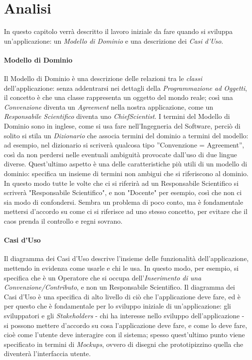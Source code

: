 \section{Analisi}
In questo capitolo verrà descritto il lavoro iniziale da fare quando si sviluppa un'applicazione: un \textsl{Modello di Dominio} e una descrizione dei \textsl{Casi d'Uso}.
\paragraph{Modello di Dominio}
Il Modello di Dominio è una descrizione delle relazioni tra le \textsl{classi} dell'applicazione: senza addentrarsi nei dettagli della \textsl{Programmazione ad Oggetti}, il concetto è che una classe rappresenta un oggetto del mondo reale; così una \textsl{Convenzione} diventa un \textsl{Agreement} nella nostra applicazione, come un \textsl{Responsabile Scientifico} diventa uno \textsl{ChiefScientist}.\newline 
I termini del Modello di Dominio sono in inglese, come si usa fare nell'Ingegneria del Software, perciò di solito si stila un \textsl{Dizionario} che associa termini del dominio a termini del modello: ad esempio, nel dizionario si scriverà qualcosa tipo ''Convenzione = Agreement'', così da non perdersi nelle eventuali ambiguità provocate dall'uso di due lingue diverse.\newline
Quest'ultimo aspetto è una delle caratteristiche più utili di un modello di dominio: specifica un insieme di termini non ambigui che si riferiscono al dominio. In questo modo tutte le volte che ci si riferirà ad un Responsabile Scientifico si scriverà "Responsabile Scientifico", e non "Docente" per esempio, così che non ci sia modo di confondersi. Sembra un problema di poco conto, ma è fondamentale mettersi d'accordo su come ci si riferisce ad uno stesso concetto, per evitare che il caos prenda il controllo e regni sovrano.
\paragraph{Casi d'Uso}
Il diagramma dei Casi d'Uso descrive l'insieme delle funzionalità dell'applicazione, mettendo in evidenza come usarle e chi le usa. In questo modo, per esempio, si specifica che è un Operatore che si occupa dell'\textsl{Inserimento di una Convenzione/Contributo}, e non un Responsabile Scientifico.\newline
Il diagramma dei Casi d'Uso è una specifica di alto livello di ciò che l'applicazione deve fare, ed è per questo che è fondamentale per lo sviluppo iniziale di un'applicazione: gli sviluppatori e gli \textsl{Stakeholders} - chi ha interesse nello sviluppo dell'applicazione - si possono mettere d'accordo su cosa l'applicazione deve fare, e come lo deve fare, cioè come l'utente deve interagire con il sistema; spesso quest'ultimo punto viene specificato in termini di \textsl{Mockups}, ovvero di disegni che prototipizzino quella che diventerà l'interfaccia utente.
